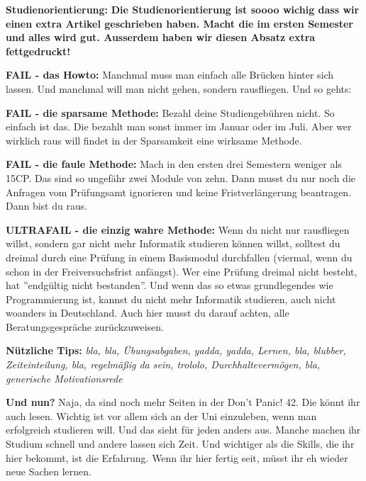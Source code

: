 \textbf{Studienorientierung:}
\textbf{
Die Studienorientierung ist soooo wichig dass wir einen extra Artikel geschrieben haben. Macht die im ersten Semester und alles wird gut. Ausserdem haben wir diesen Absatz extra fettgedruckt!}

\textbf{FAIL - das Howto:}
Manchmal muss man einfach alle Br\"ucken hinter sich lassen. Und manchmal will man nicht gehen, sondern rausfliegen. Und so gehts:

\textbf{FAIL - die sparsame Methode:}
Bezahl deine Studiengeb\"uhren nicht. So einfach ist das. Die bezahlt man sonst immer im Januar oder im Juli. Aber wer wirklich raus will findet in der Sparsamkeit eine wirksame Methode.

\textbf{FAIL - die faule Methode:}
Mach in den ersten drei Semestern weniger als 15CP. Das sind so ungef\"ahr zwei Module von zehn. Dann musst du nur noch die Anfragen vom Pr\"ufungsamt ignorieren und keine Fristverl\"angerung beantragen. Dann bist du raus.

\textbf{ULTRAFAIL - die einzig wahre Methode:}
Wenn du nicht nur rausfliegen willst, sondern gar nicht mehr Informatik
studieren k\"onnen willst, solltest du dreimal durch eine Pr\"ufung in einem
Basismodul durchfallen (viermal, wenn du schon in der Freiversuchsfrist
anf\"angst). Wer eine Pr\"ufung dreimal nicht besteht, hat ''endg\"ultig nicht
bestanden''. Und wenn das so etwas grundlegendes wie Programmierung ist, kannst
du nicht mehr Informatik studieren, auch nicht woanders in Deutschland. Auch
hier musst du darauf achten, alle Beratungsgespr\"ache zur\"uckzuweisen.

\textbf{N\"utzliche Tips:}
\emph{bla, bla, \"Ubungsabgaben, yadda, yadda, Lernen, bla, blubber, Zeiteinteilung, bla, regelm\"a{\ss}ig da sein, trololo, Durchhalteverm\"ogen, bla, generische Motivationsrede}

\textbf{Und nun?}
Naja, da sind noch mehr Seiten in der Don't Panic! 42. Die k\"onnt ihr auch
lesen. Wichtig ist vor allem sich an der Uni einzuleben, wenn man erfolgreich
studieren will. Und das sieht f\"ur jeden anders aus. Manche machen ihr Studium
schnell und andere lassen sich Zeit. Und wichtiger als die Skills, die ihr hier
bekommt, ist die Erfahrung. Wenn ihr hier fertig seit, m\"usst ihr eh wieder
neue Sachen lernen.





